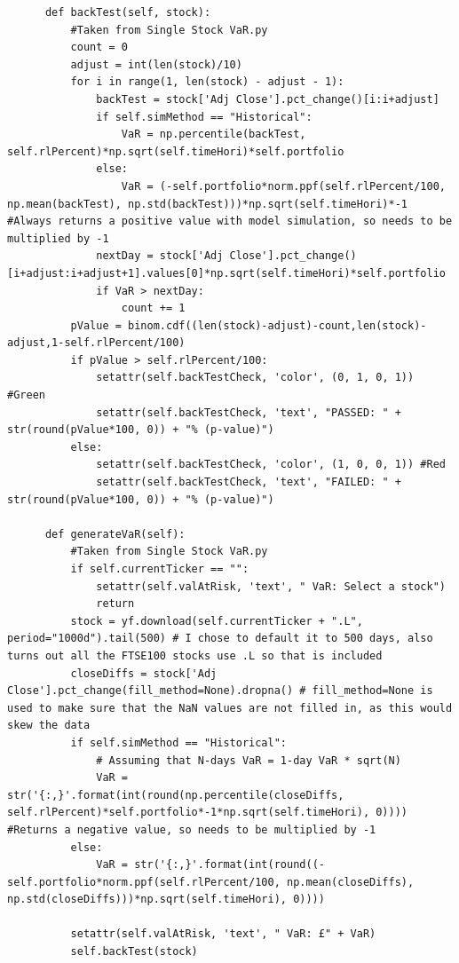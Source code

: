 \documentclass{article}
\begin{document}
\begin{verbatim}
      def backTest(self, stock):
          #Taken from Single Stock VaR.py
          count = 0
          adjust = int(len(stock)/10)
          for i in range(1, len(stock) - adjust - 1):
              backTest = stock['Adj Close'].pct_change()[i:i+adjust]
              if self.simMethod == "Historical":
                  VaR = np.percentile(backTest, self.rlPercent)*np.sqrt(self.timeHori)*self.portfolio
              else:
                  VaR = (-self.portfolio*norm.ppf(self.rlPercent/100, np.mean(backTest), np.std(backTest)))*np.sqrt(self.timeHori)*-1 #Always returns a positive value with model simulation, so needs to be multiplied by -1
              nextDay = stock['Adj Close'].pct_change()[i+adjust:i+adjust+1].values[0]*np.sqrt(self.timeHori)*self.portfolio
              if VaR > nextDay:
                  count += 1
          pValue = binom.cdf((len(stock)-adjust)-count,len(stock)-adjust,1-self.rlPercent/100)
          if pValue > self.rlPercent/100:
              setattr(self.backTestCheck, 'color', (0, 1, 0, 1)) #Green
              setattr(self.backTestCheck, 'text', "PASSED: " + str(round(pValue*100, 0)) + "% (p-value)")
          else:
              setattr(self.backTestCheck, 'color', (1, 0, 0, 1)) #Red
              setattr(self.backTestCheck, 'text', "FAILED: " + str(round(pValue*100, 0)) + "% (p-value)")

      def generateVaR(self):
          #Taken from Single Stock VaR.py
          if self.currentTicker == "":
              setattr(self.valAtRisk, 'text', " VaR: Select a stock")
              return
          stock = yf.download(self.currentTicker + ".L", period="1000d").tail(500) # I chose to default it to 500 days, also turns out all the FTSE100 stocks use .L so that is included
          closeDiffs = stock['Adj Close'].pct_change(fill_method=None).dropna() # fill_method=None is used to make sure that the NaN values are not filled in, as this would skew the data
          if self.simMethod == "Historical":
              # Assuming that N-days VaR = 1-day VaR * sqrt(N)
              VaR = str('{:,}'.format(int(round(np.percentile(closeDiffs, self.rlPercent)*self.portfolio*-1*np.sqrt(self.timeHori), 0)))) #Returns a negative value, so needs to be multiplied by -1
          else:
              VaR = str('{:,}'.format(int(round((-self.portfolio*norm.ppf(self.rlPercent/100, np.mean(closeDiffs), np.std(closeDiffs)))*np.sqrt(self.timeHori), 0))))
          
          setattr(self.valAtRisk, 'text', " VaR: £" + VaR)        
          self.backTest(stock)


\end{verbatim}
\end{document}
